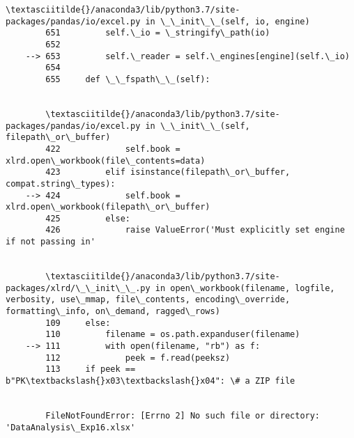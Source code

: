 \documentclass[11pt]{article}
\begin{document}
\begin{Verbatim}[commandchars=\\\{\}]
        \textasciitilde{}/anaconda3/lib/python3.7/site-packages/pandas/io/excel.py in \_\_init\_\_(self, io, engine)
        651         self.\_io = \_stringify\_path(io)
        652 
    --> 653         self.\_reader = self.\_engines[engine](self.\_io)
        654 
        655     def \_\_fspath\_\_(self):


        \textasciitilde{}/anaconda3/lib/python3.7/site-packages/pandas/io/excel.py in \_\_init\_\_(self, filepath\_or\_buffer)
        422             self.book = xlrd.open\_workbook(file\_contents=data)
        423         elif isinstance(filepath\_or\_buffer, compat.string\_types):
    --> 424             self.book = xlrd.open\_workbook(filepath\_or\_buffer)
        425         else:
        426             raise ValueError('Must explicitly set engine if not passing in'


        \textasciitilde{}/anaconda3/lib/python3.7/site-packages/xlrd/\_\_init\_\_.py in open\_workbook(filename, logfile, verbosity, use\_mmap, file\_contents, encoding\_override, formatting\_info, on\_demand, ragged\_rows)
        109     else:
        110         filename = os.path.expanduser(filename)
    --> 111         with open(filename, "rb") as f:
        112             peek = f.read(peeksz)
        113     if peek == b"PK\textbackslash{}x03\textbackslash{}x04": \# a ZIP file


        FileNotFoundError: [Errno 2] No such file or directory: 'DataAnalysis\_Exp16.xlsx'

    \end{Verbatim}
\end{document}
